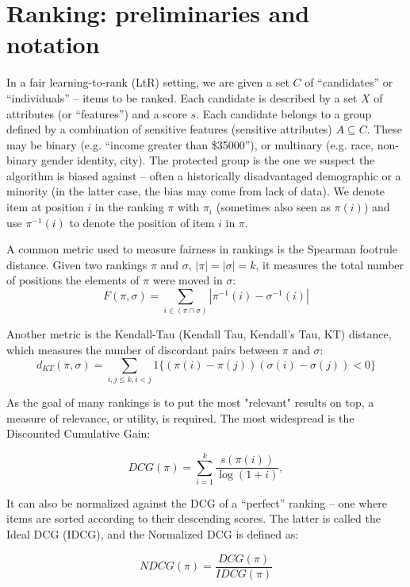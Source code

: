 \section{Ranking: preliminaries and notation}\label{sect:int_2}

In a fair learning-to-rank (LtR) setting, we are given a set $C$ of “candidates” or “individuals” – items to be ranked. Each candidate is described by a set $X$ of attributes (or “features”) and a score $s$. Each candidate belongs to a group defined by a combination of sensitive features (sensitive attributes) $A\subseteq C$. These may be binary (e.g. “income greater than \$35000”), or multinary (e.g. race, non-binary gender identity, city). The protected group is the one we suspect the algorithm is biased against – often a historically disadvantaged demographic or a minority (in the latter case, the bias may come from lack of data). We denote item at position $i$ in the ranking $\pi$ with $\pi_i$ (sometimes also seen as $\pi(i)$) and use $\pi^{-1}(i)$ to denote the position of item $i$ in $\pi$.

A common metric used to measure fairness in rankings is the Spearman footrule distance. Given two rankings $\pi$ and $\sigma$, $|\pi| = |\sigma|=k$, it measures the total number of positions the elements of $\pi$ were moved in $\sigma$:
\begin{equation*}\label{eq:spearman}
F(\pi, \sigma) = \sum_{i \in (\pi \cap \sigma)} |\pi^{-1}(i) - \sigma^{-1}(i)|
\end{equation*}

Another metric is the Kendall-Tau (Kendall Tau, Kendall's Tau, KT) distance, which measures the number of discordant pairs between $\pi$ and $\sigma$:
\begin{equation*}\label{eq:kt}
d_{KT}(\pi, \sigma) = \sum_{i,j \leq k, i < j} 1\{ (\pi(i) - \pi(j))(\sigma(i) - \sigma(j)) < 0 \}
\end{equation*}

As the goal of many rankings is to put the most "relevant" results on top, a measure of relevance, or utility, is required. The most widespread is the Discounted Cumulative Gain:

\[ DCG(\pi) = \sum_{i=1}^k \frac{s(\pi(i))}{\log(1+i)}, \]

It can also be normalized against the DCG of a “perfect” ranking – one where items are sorted according to their descending scores. The latter is called the Ideal DCG (IDCG), and the Normalized DCG is defined as:

\[NDCG(\pi) = \frac{DCG(\pi)}{IDCG(\pi)}\]

